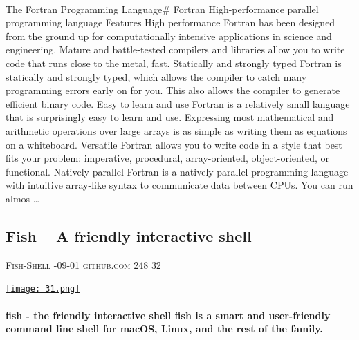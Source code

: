 \documentclass[10pt,a4paper]{article}
\begin{document}
\begin{multicols}{2}
\paragraph{}
The Fortran Programming Language\#
Fortran
High-performance parallel programming language
Features
High performance
Fortran has been designed from the ground up for computationally intensive applications in science and engineering. Mature and battle-tested compilers and libraries allow you to write code that runs close to the metal, fast.
Statically and strongly typed
Fortran is statically and strongly typed, which allows the compiler to catch many programming errors early on for you. This also allows the compiler to generate efficient binary code.
Easy to learn and use
Fortran is a relatively small language that is surprisingly easy to learn and use. Expressing most mathematical and arithmetic operations over large arrays is as simple as writing them as equations on a whiteboard.
Versatile
Fortran allows you to write code in a style that best fits your problem: imperative, procedural, array-oriented, object-oriented, or functional.
Natively parallel
Fortran is a natively parallel programming language with intuitive array-like syntax to communicate data between CPUs. You can run almos
\dots\par
\noindent\begin{minipage}{\linewidth}
\medskip
\subsection{Fish – A friendly interactive shell}
\textsc{\footnotesize
{\scriptsize\faUser}\space 
Fish-Shell 
{\scriptsize\faCalendar}-09-01 
{\scriptsize\faGithub}\space 
github.com 
{\scriptsize\faThumbsOUp}\space 
\href{http://news.ycombinator.com/item?id=37272611\&utm\_term=comment}{248} 
{\scriptsize\faComments}\space 
\href{http://news.ycombinator.com/item?id=37272611\&utm\_term=comment}{32} 
}
\par\medskip\noindent
\href{https://github.com/fish-shell/fish-shell?utm\_source=hackernewsletter\&utm\_medium=email\&utm\_term=code}{
    \texttt{[image: 31.png]}
}
\end{minipage}
\paragraph{}
\textbf{fish - the friendly interactive shell
fish is a smart and user-friendly command line shell for macOS, Linux, and the rest of the family.}

\end{multicols}
\end{document}
